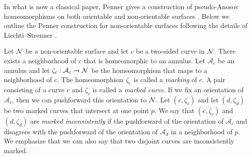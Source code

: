 In what is now a classical paper, Penner gives a construction of pseudo-Anosov homeomorphisms on both orientable and non-orientable surfaces \cite{penner1988construction}.  Below we outline the Penner construction for non-orientable surfaces following the details of Liechti--Strenner \cite[Section 2]{LS}.

%

  Let $\mathcal{N}$ be a non-orientable surface and let $c$ be a two-sided curve in $\mathcal{N}$.  There exists a neighborhood of $c$ that is homeomorphic to an annulus.  Let $\mathcal{A}_c$ be an annulus and let $\zeta_c: \mathcal{A}_c \xrightarrow{} \mathcal{N}$ be the homeomorphism that maps to a neighborhood of $c$.  The homeomorphism $\zeta_c$ is called a \textit{marking} of $c$. A pair consisting of a curve $c$ and $\zeta_c$ is called a {\it marked curve}.
 If we fix an
orientation of $\mathcal{A}_c$, then we can pushforward this orientation to $\mathcal{N}$. Let
$(c,\zeta_c)$ and let $(d,\zeta_d)$ be two marked curves that intersect at one point $p$.  We say that $(c,\zeta_c)$ and $(d,\zeta_d)$ are {\it marked inconsistently} if the
pushforward of the orientation of $\mathcal{A}_c$ and disagrees with the pushforward of the orientation of $\mathcal{A}_d$ in a neighborhood of $p$.  We emphasize that we can also say that two disjoint curves are inconsistently marked.


